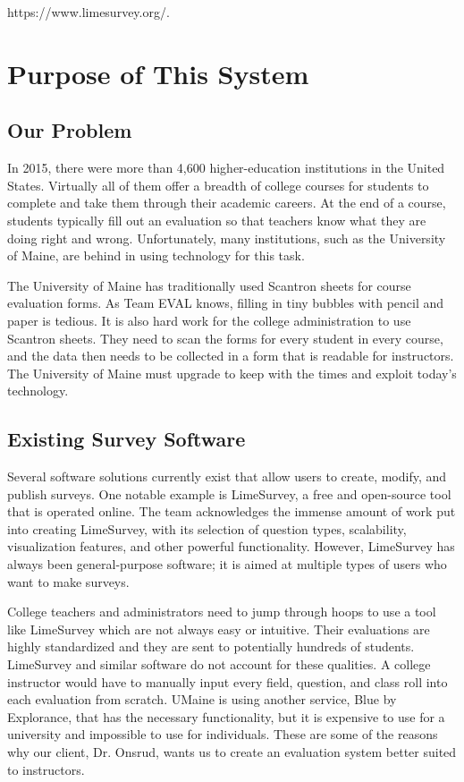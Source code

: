 \documentclass{article}
\begin{document}
https://www.limesurvey.org/.

\section{Purpose of This System}

\subsection{Our Problem}

In 2015, there were more than 4,600 higher-education institutions in the United States. Virtually all of them offer a breadth of college courses for students to complete and take them through their academic careers. At the end of a course, students typically fill out an evaluation so that teachers know what they are doing right and wrong. Unfortunately, many institutions, such as the University of Maine, are behind in using technology for this task.

The University of Maine has traditionally used Scantron sheets for course evaluation forms. As Team EVAL knows, filling in tiny bubbles with pencil and paper is tedious. It is also hard work for the college administration to use Scantron sheets. They need to scan the forms for every student in every course, and the data then needs to be collected in a form that is readable for instructors. The University of Maine must upgrade to keep with the times and exploit today's technology.

\subsection{Existing Survey Software}

Several software solutions currently exist that allow users to create, modify, and publish surveys. One notable example is LimeSurvey, a free and open-source tool that is operated online. The team acknowledges the immense amount of work put into creating LimeSurvey, with its selection of question types, scalability, visualization features, and other powerful functionality. However, LimeSurvey has always been general-purpose software; it is aimed at multiple types of users who want to make surveys.

College teachers and administrators need to jump through hoops to use a tool like LimeSurvey which are not always easy or intuitive. Their evaluations are highly standardized and they are sent to potentially hundreds of students. LimeSurvey and similar software do not account for these qualities. A college instructor would have to manually input every field, question, and class roll into each evaluation from scratch.  UMaine is using another service, Blue by Explorance, that has the necessary functionality, but it is expensive to use for a university and impossible to use for individuals. These are some of the reasons why our client, Dr. Onsrud, wants us to create an evaluation system better suited to instructors.
\end{document}
